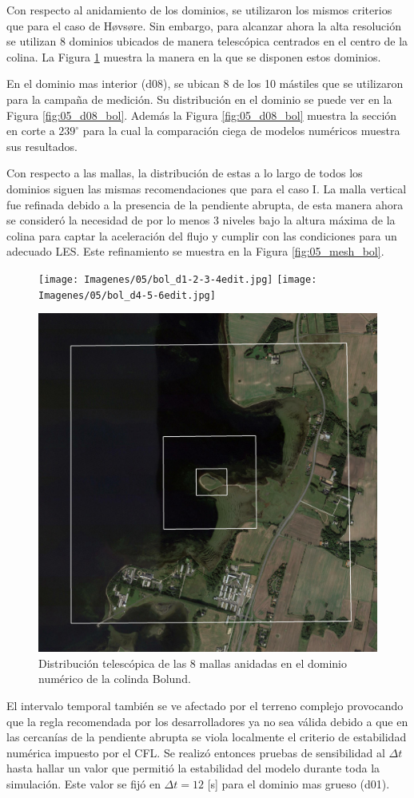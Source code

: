 Con respecto al anidamiento de los dominios, se utilizaron los mismos criterios que para el caso de Høvsøre. Sin embargo, para alcanzar ahora la alta resolución se utilizan 8 dominios ubicados de manera telescópica centrados en el centro de la colina. La Figura \ref{fig:05_dom_bol} muestra la manera en la que se disponen estos dominios.

En el dominio mas interior (d08), se ubican 8 de los 10 mástiles que se utilizaron para la campaña de medición. Su distribución en el dominio se puede ver en la Figura \ref{fig:05_d08_bol}. Además la Figura \ref{fig:05_d08_bol} muestra la sección en corte a $239^\circ$ para la cual la comparación ciega de modelos numéricos muestra sus resultados.

Con respecto a las mallas, la distribución de estas a lo largo de todos los dominios siguen las mismas recomendaciones que para el caso I. La malla vertical fue refinada debido a la presencia de la pendiente abrupta, de esta manera ahora se consideró la necesidad de por lo menos 3 niveles bajo la altura máxima de la colina para captar la aceleración del flujo y cumplir con las condiciones para un adecuado LES. Este refinamiento se muestra en la Figura \ref{fig:05_mesh_bol}.

\begin{figure}[H]
	\centering
	\texttt{[image: Imagenes/05/bol\_d1-2-3-4edit.jpg]}
	\texttt{[image: Imagenes/05/bol\_d4-5-6edit.jpg]}
	
	\bigskip
	\includegraphics[width=0.48\linewidth,page=1,trim={5mm 3mm 3mm 3mm},clip,frame]{Imagenes/05/bol_d6-7-8edit.jpg}%
	
	\caption{Distribución telescópica de las 8 mallas anidadas en el dominio numérico de la colinda Bolund.}
	\label{fig:05_dom_bol}
\end{figure}

El intervalo temporal también se ve afectado por el terreno complejo provocando que la regla recomendada por los desarrolladores ya no sea válida debido a que en las cercanías de la pendiente abrupta se viola localmente el criterio de estabilidad numérica impuesto por el CFL. Se realizó entonces pruebas de sensibilidad al $\Delta t$ hasta hallar un valor que permitió la estabilidad del modelo durante toda la simulación. Este valor se fijó en $\Delta t = 12$ [s] para el dominio mas grueso (d01).

